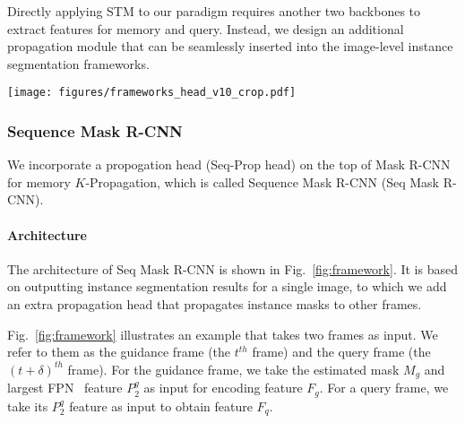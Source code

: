 \documentclass[10pt,twocolumn,letterpaper]{article}
\begin{document}
	Directly applying STM to our paradigm requires another two backbones to extract features for memory and query. 
	Instead, we design an additional propagation module that can be seamlessly inserted into the image-level instance segmentation frameworks.
	
	\begin{figure*}[t]
		\begin{center}
			\texttt{[image: figures/frameworks\_head\_v10\_crop.pdf]}
		\end{center}
		\caption{Framework of \textbf{Seq Mask R-CNN}. We adopt \textbf{Seq-Prop head} on Mask R-CNN for propagating instance masks from the guidance frame at time $t$ to a query frame at time $t+\delta$. $P_2^g$, $P_2^q$ are the largest FPN~\cite{lin2017feature} feature of input images, and $C_2^q$ is the largest backbone feature. \textbf{NL} is a non-local operation~\cite{wang2018non}. `$\times 2$' denotes $2$ consecutive residual blocks. `$\otimes$' and `$\oplus$' denote matrix multiplication and summation, respectively. Detailed architectures are illustrated in the supplementary files. }
		\label{fig:framework}
		\vspace{-0.1in}
	\end{figure*}
	
	
	\subsubsection{Sequence Mask R-CNN}\label{Sec:SPH}
	We incorporate a propogation head (Seq-Prop head) on the top of Mask R-CNN for memory $K$-Propagation, which is called Sequence Mask R-CNN (Seq Mask R-CNN).
	
	\vspace{-0.1in}
	
	\paragraph{Architecture} The architecture of Seq Mask R-CNN is shown in Fig.~\ref{fig:framework}. It is based on outputting instance segmentation results for a single image, to which we add an extra propagation head that propagates instance masks to other frames.
	
	Fig.~\ref{fig:framework} illustrates an example that takes two frames as input. We refer to them as the guidance frame (the $t^{th}$ frame) and the query frame (the $(t + \delta)^{th}$ frame). 
	For the guidance frame, we take the estimated mask $M_g$ and largest FPN~\cite{lin2017feature} feature $P_2^g$ as input for encoding feature $F_g$. For a query frame, we take its $P_2^q$ feature as input to obtain feature $F_q$.
	
\end{document}
